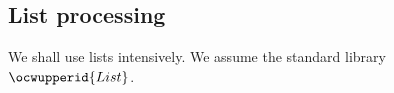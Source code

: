 \subsection{List processing}

We shall use lists intensively. We assume the standard library 
\ocwbegincode{}$\ocwupperid{List}$\ocwendcode{}. %

